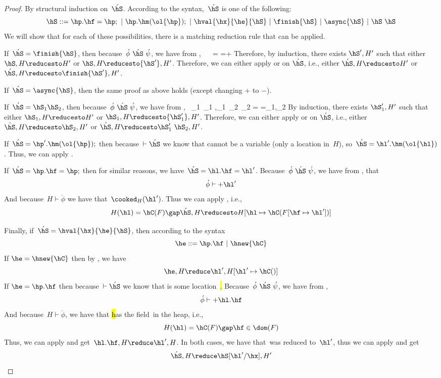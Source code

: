\begin{proof}
By structural induction on~$\acute{\hS}$.
According to the syntax,~$\acute{\hS}$ is one of the following: \[
\hS ::=  \hp.\hf = \hp; ~|~ \hp.\hm(\ol{\hp});  ~|~ \hval{\hx}{\he}{\hS} ~|~ \finish{\hS}~|~ \async{\hS} ~|~ \hS~\hS
\]
We will show that for each of these possibilities, there is a matching reduction rule that can be applied.

If~$\acute{\hS} = \finish{\hS}$, then because~$\acute{\phi}~\acute{\hS}~\acute{\psi}$, we have from ,
\phi~\hS~\psi \gap
\acute{\phi}=\phi \gap
\acute{\psi}=+\psi
\eeq
Therefore, by induction, there exists $\hS',H'$ such
    that either ${\hS},H \reducesto H'$ or ${\hS},H \reducesto {\hS'},H'$.
Therefore, we can either apply  or  on $\acute{\hS}$,
    i.e., either $\acute{\hS},H \reducesto H'$ or $\acute{\hS},H \reducesto \finish{\hS'},H'$.

If~$\acute{\hS} = \async{\hS}$, then the same proof as above holds (except changing $+$ to $-$).

If~$\acute{\hS} = \hS_1 \hS_2$, then because~$\acute{\phi}~\acute{\hS}~\acute{\psi}$, we have from ,
  \phi~\hS_1~\psi_1
        \gap
    \phi,\psi_1~\hS_2~\psi_2 \gap
    \acute{\phi}=\phi \gap
    \acute{\psi}=\psi_1,\psi_2
\eeq
By induction, there exists $\hS'_1,H'$ such
    that either ${\hS_1},H \reducesto H'$ or ${\hS_1},H \reducesto {\hS'_1},H'$.
Therefore, we can either apply  or  on $\acute{\hS}$,
    i.e., either $\acute{\hS},H \reducesto \hS_2,H'$ or $\acute{\hS},H \reducesto \hS'_1~\hS_2,H'$.

If~$\acute{\hS} = \hp'.\hm(\ol{\hp});$ then because~$\vdash \acute{\hS}$ we know that \hp cannot be a variable (only a location in~$H$),
    so~$\acute{\hS} = \hl'.\hm(\ol{\hl})$.
Thus, we can apply .

If~$\acute{\hS} = \hp.\hf = \hp;$ then for similar reasons, we have~$\acute{\hS} = \hl.\hf=\hl'$.
Because~$\acute{\phi}~\acute{\hS}~\acute{\psi}$, we have from , that \[
\acute{\phi} \vdash +\hl'
\]
And because~$H \vdash \acute{\phi}$ we have that~$\cooked_H(\hl')$.
Thus we can apply , i.e., \[
    H(\hl)=\hC(F) \gap
    \acute{\hS},H \reducesto H[ \hl \mapsto \hC(F[ \hf \mapsto \hl'])]
\]

Finally, if~$\acute{\hS} = \hval{\hx}{\he}{\hS}$, then according to the syntax \[
\he ::=  \hp.\hf  ~|~ \hnew{\hC}
\]
If $\he = \hnew{\hC}$ then by , we have \[
    \he,H \reduce \hl',H[ \hl' \mapsto \hC()]
\]
If $\he = \hp.\hf$ then because~$\vdash \acute{\hS}$ we know that \hp is some location~\hl.
Because~$\acute{\phi}~\acute{\hS}~\acute{\psi}$, we have from , \[
    \acute{\phi} \vdash +\hl.\hf
\]
And because~$H \vdash \acute{\phi}$, we have that \hl has the field~\hf in the heap, i.e., \[
    H(\hl)=\hC(F) \gap \hf \in \dom(F)
\]
Thus, we can apply  and get~$\hl.\hf,H \reduce \hl',H$.
In both cases, we have that~\he was reduced to~$\hl'$, thus we can apply  and get \[
    \acute{\hS},H \reduce \hS[\hl'/\hx], H'
\]
\end{proof}
